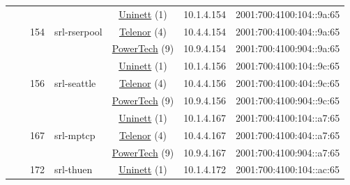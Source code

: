 \begin{small}
\begin{center}
\begin{longtable}{|c|c|c|c|c|c|c|c|}
  &  & \multirow{3}{*}{\tiny{154}} & \multicolumn{1}{|l|}{\multirow{3}{*}{\tiny{srl-rserpool}}} & \multicolumn{2}{|c|}{\tiny{\href{https://www.uninett.no}{Uninett} (1)}} & \tiny{10.1.4.154} & \tiny{2001:700:4100:104::9a:65} \\* \cline{5-5}\cline{6-6}\cline{7-7}\cline{8-8}
  &  &  &  & \multicolumn{2}{|c|}{\tiny{\href{https://www.telenor.no}{Telenor} (4)}} & \tiny{10.4.4.154} & \tiny{2001:700:4100:404::9a:65} \\* \cline{5-5}\cline{6-6}\cline{7-7}\cline{8-8}
  &  &  &  & \multicolumn{2}{|c|}{\tiny{\href{http://www.powertech.no}{PowerTech} (9)}} & \tiny{10.9.4.154} & \tiny{2001:700:4100:904::9a:65} \\* \cline{3-3}\cline{4-4}\cline{5-5}\cline{6-6}\cline{7-7}\cline{8-8}
  &  & \multirow{3}{*}{\tiny{156}} & \multicolumn{1}{|l|}{\multirow{3}{*}{\tiny{srl-seattle}}} & \multicolumn{2}{|c|}{\tiny{\href{https://www.uninett.no}{Uninett} (1)}} & \tiny{10.1.4.156} & \tiny{2001:700:4100:104::9c:65} \\* \cline{5-5}\cline{6-6}\cline{7-7}\cline{8-8}
  &  &  &  & \multicolumn{2}{|c|}{\tiny{\href{https://www.telenor.no}{Telenor} (4)}} & \tiny{10.4.4.156} & \tiny{2001:700:4100:404::9c:65} \\* \cline{5-5}\cline{6-6}\cline{7-7}\cline{8-8}
  &  &  &  & \multicolumn{2}{|c|}{\tiny{\href{http://www.powertech.no}{PowerTech} (9)}} & \tiny{10.9.4.156} & \tiny{2001:700:4100:904::9c:65} \\* \cline{3-3}\cline{4-4}\cline{5-5}\cline{6-6}\cline{7-7}\cline{8-8}
  &  & \multirow{3}{*}{\tiny{167}} & \multicolumn{1}{|l|}{\multirow{3}{*}{\tiny{srl-mptcp}}} & \multicolumn{2}{|c|}{\tiny{\href{https://www.uninett.no}{Uninett} (1)}} & \tiny{10.1.4.167} & \tiny{2001:700:4100:104::a7:65} \\* \cline{5-5}\cline{6-6}\cline{7-7}\cline{8-8}
  &  &  &  & \multicolumn{2}{|c|}{\tiny{\href{https://www.telenor.no}{Telenor} (4)}} & \tiny{10.4.4.167} & \tiny{2001:700:4100:404::a7:65} \\* \cline{5-5}\cline{6-6}\cline{7-7}\cline{8-8}
  &  &  &  & \multicolumn{2}{|c|}{\tiny{\href{http://www.powertech.no}{PowerTech} (9)}} & \tiny{10.9.4.167} & \tiny{2001:700:4100:904::a7:65} \\* \cline{3-3}\cline{4-4}\cline{5-5}\cline{6-6}\cline{7-7}\cline{8-8}
  &  & \multirow{3}{*}{\tiny{172}} & \multicolumn{1}{|l|}{\multirow{3}{*}{\tiny{srl-thuen}}} & \multicolumn{2}{|c|}{\tiny{\href{https://www.uninett.no}{Uninett} (1)}} & \tiny{10.1.4.172} & \tiny{2001:700:4100:104::ac:65} \\* \cline{5-5}\cline{6-6}\cline{7-7}\cline{8-8}

\end{longtable}
\end{center}
\end{small}
